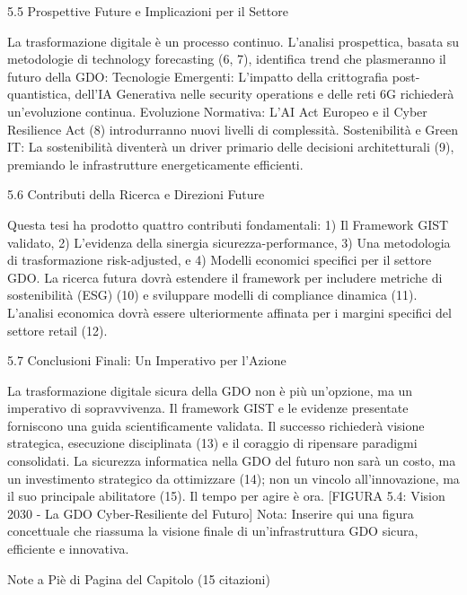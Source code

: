5.5 Prospettive Future e Implicazioni per il Settore

La trasformazione digitale è un processo continuo. L'analisi prospettica, basata su metodologie di technology forecasting (6, 7), identifica trend che plasmeranno il futuro della GDO:
Tecnologie Emergenti: L'impatto della crittografia post-quantistica, dell'IA Generativa nelle security operations e delle reti 6G richiederà un'evoluzione continua.
Evoluzione Normativa: L'AI Act Europeo e il Cyber Resilience Act (8) introdurranno nuovi livelli di complessità.
Sostenibilità e Green IT: La sostenibilità diventerà un driver primario delle decisioni architetturali (9), premiando le infrastrutture energeticamente efficienti.

5.6 Contributi della Ricerca e Direzioni Future

Questa tesi ha prodotto quattro contributi fondamentali: 1) Il Framework GIST validato, 2) L'evidenza della sinergia sicurezza-performance, 3) Una metodologia di trasformazione risk-adjusted, e 4) Modelli economici specifici per il settore GDO. La ricerca futura dovrà estendere il framework per includere metriche di sostenibilità (ESG) (10) e sviluppare modelli di compliance dinamica (11). L'analisi economica dovrà essere ulteriormente affinata per i margini specifici del settore retail (12).

5.7 Conclusioni Finali: Un Imperativo per l'Azione

La trasformazione digitale sicura della GDO non è più un'opzione, ma un imperativo di sopravvivenza. Il framework GIST e le evidenze presentate forniscono una guida scientificamente validata. Il successo richiederà visione strategica, esecuzione disciplinata (13) e il coraggio di ripensare paradigmi consolidati. La sicurezza informatica nella GDO del futuro non sarà un costo, ma un investimento strategico da ottimizzare (14); non un vincolo all'innovazione, ma il suo principale abilitatore (15). Il tempo per agire è ora.
[FIGURA 5.4: Vision 2030 - La GDO Cyber-Resiliente del Futuro]
Nota: Inserire qui una figura concettuale che riassuma la visione finale di un'infrastruttura GDO sicura, efficiente e innovativa.

Note a Piè di Pagina del Capitolo (15 citazioni)

